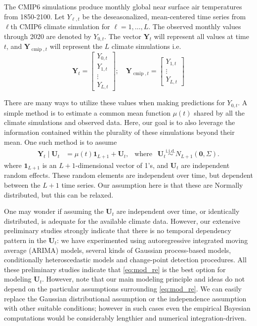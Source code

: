 \documentclass{CUP-JNL-EDS}
\newcommand{\iid}{\overset{\text{i.i.d.}}{\sim}}
\begin{document}
The CMIP6 simulations produce monthly global near surface air temperatures from 1850-2100. Let $Y_{\ell, t}$ be the deseasonalized, mean-centered time series from $\ell$th CMIP6 climate simulation for $\ell = 1,\dots,L$. The observed monthly values through 2020 are denoted by $Y_{0,t}$. The vector $\bm{Y}_t$ will represent all values at time $t$, and $\bm{Y}_{\operatorname{cmip},t}$ will represent the $L$ climate simulations i.e.
\begin{equation}
    \bm{Y}_t = \begin{bmatrix} Y_{0,t} \\ Y_{1,t} \\ \vdots \\ Y_{L,t} \end{bmatrix}; \quad \bm{Y}_{\operatorname{cmip},t} = \begin{bmatrix}  Y_{1,t} \\ \vdots \\ Y_{L,t} \end{bmatrix}
\end{equation}

There are many ways to utilize these values when making predictions for $Y_{0,t}$. A simple method is to estimate a common mean function $\mu(t)$ shared by all the climate simulations and observed data. Here, our goal is to also leverage the information contained within the plurality of these simulations beyond their mean. One such method is to assume
\begin{align}
    \bm{Y}_t \mid \bm{U}_t &= \mu(t)\bm{1}_{L+1} + \bm{U}_t, \ \ 
    \text{ where } \ \ 
    \bm{U}_t  \iid N_{L+1}(\bm{0}, \Sigma). \label{eq:mod_re}
\end{align}
where $\bm{1}_{L+1}$ is an $L+1$-dimensional vector of 1's, and $\bm{U}_t$ are independent random effects. These random elements are independent over time, but dependent between the $L+1$ time series. Our assumption here is that these are Normally distributed, but this can be relaxed.

One may wonder if assuming the $\bm{U}_{t}$ are independent over time, or identically distributed, is adequate for the available climate data. However, our extensive preliminary studies strongly indicate that there is no temporal dependency pattern in the $\bm{U}_{t}$: we have experimented using autoregressive integrated moving average (ARIMA) models, several kinds of Gaussian process-based models, conditionally heteroscedastic models and change-point detection procedures. All these preliminary studies indicate that \eqref{eq:mod_re} is the best option for modeling $\bm{U}_{t}$. However, note that our main modeling principle and ideas do not depend on the particular assumptions surrounding \eqref{eq:mod_re}. We can easily replace the Gaussian distributional assumption or the independence assumption with other suitable conditions; however in such cases even the empirical Bayesian computations would be considerably lengthier and numerical integration-driven.
\end{document}
